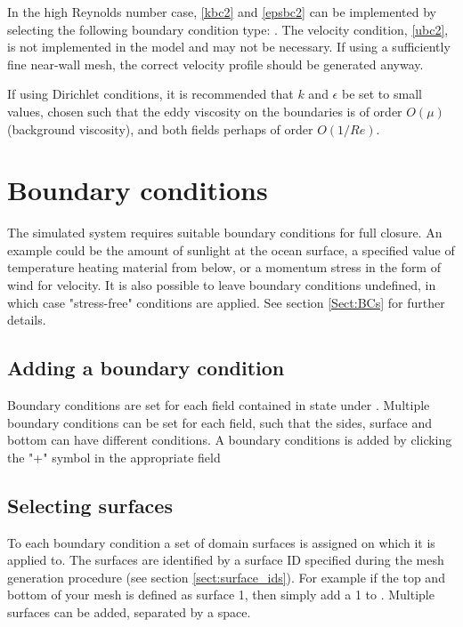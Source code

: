 In the high Reynolds number case, \eqref{kbc2} and \eqref{epsbc2} can be implemented by selecting the following boundary condition type: . The velocity condition, \eqref{ubc2}, is not implemented in the model and may not be necessary. If using a sufficiently fine near-wall mesh, the correct velocity profile should be generated anyway.

If using Dirichlet conditions, it is recommended that $k$ and $\epsilon$ be set to small values, chosen such that the eddy viscosity on the boundaries is of order $O(\mu)$ (background viscosity), and both fields perhaps of order $O(1/Re)$.

\section{Boundary conditions}\label{Sect:BCs_configure}

The simulated system requires suitable boundary conditions for full closure.
An example could be the amount of sunlight at the ocean surface, a specified value of
temperature heating material from below, or a momentum stress in the form of wind for velocity.
It is also possible to leave boundary conditions undefined, in which case "stress-free" conditions are
applied. See section \ref{Sect:BCs} for further details.

\subsection{Adding a boundary condition}\label{Sect:BCs:adding}

Boundary conditions are set for each field contained in state under . 
Multiple boundary conditions can be set for each field, such that the sides, surface and bottom can 
have different conditions. A boundary conditions is added by clicking the "+" symbol
in the appropriate field

\subsection{Selecting surfaces}\label{Sect:BCs:selecting}
To each boundary condition a set of domain surfaces is assigned on which it is applied to. The surfaces are identified by a surface ID specified during the mesh generation procedure (see section \ref{sect:surface_ids}). For example if the top and bottom of your mesh is defined as surface
1, then simply add a 1 to . Multiple surfaces 
can be added, separated by a space.

